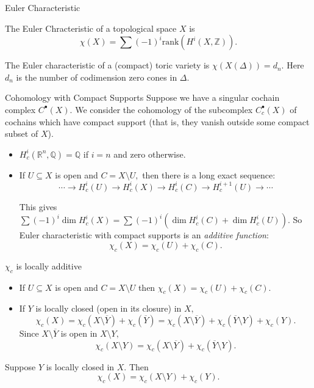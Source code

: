 \documentclass{beamer}
\newcommand{\Z}{\mathbb{Z}}
\begin{document}
\begin{frame}{Euler Characteristic}

\begin{Definition}
 The Euler Chracteristic of a topological space $X$ is $$ \chi(X) = \sum (-1)^i \text{rank}\left( H^i(X, \Z) \right). $$ 
\end{Definition}


\begin{Theorem}
 The Euler characteristic of a (compact) toric variety is $\chi(X(\Delta))=d_n.$ Here $d_n$ is the number of codimension zero cones in $\Delta.$ 
\end{Theorem}
\end{frame}

\begin{frame}{Cohomology with Compact Supports}
 Suppose we have a singular cochain complex $C^{\bullet}(X).$ We consider the cohomology of the subcomplex $C^{\bullet}_c(X)$ of cochains which have compact support (that is, they vanish outside some compact subset of $X$).

\begin{itemize}
 \item $H^i_c(\mathbb{R}^n, \mathbb{Q})= \mathbb{Q}$ if $i=n$ and zero otherwise.
\item If $U\subseteq X$ is open and $C= X\setminus U,$ then there is a long exact sequence: $$ \cdots \to H^i_c(U) \to H^i_c (X) \to H^i_c (C) \to H^{i+1}_c (U) \to \cdots$$

This gives $\sum (-1)^i \dim H^i_c(X) = \sum (-1)^i \left(\dim H^i_c (C) +\dim H^i_c (U)\right).$ So Euler characteristic with compact supports is an {\em additive function}:$$\chi_c(X) = \chi_c(U)+\chi_c(C).$$

\end{itemize}

\end{frame}


\begin{frame}{$\chi_c$ is locally additive}
\begin{itemize}
 \item If $U\subseteq X$ is open and $C= X\setminus U$ then $\chi_c(X) = \chi_c(U)+\chi_c(C).$

 \item If $Y$ is locally closed (open in its closure) in $X,$  $$\chi_c(X) = \chi_c(X\setminus \overline{Y}) + \chi_c(\overline{Y}) = \chi_c(X\setminus \overline{Y})+ \chi_c(\overline{Y}\setminus Y) + \chi_c(Y).$$ Since $X\setminus \overline{Y}$ is open in $X\setminus Y,$ $$\chi_c(X\setminus Y) = \chi_c( X\setminus \overline{Y} ) + \chi_c( \overline{Y}\setminus Y ).$$
\end{itemize}
 
\begin{Lemma}
 Suppose $Y$ is locally closed in $X.$ Then $$\chi_c(X) = \chi_c(X\setminus Y) + \chi_c(Y).$$
\end{Lemma}

\end{frame}
\end{document}
